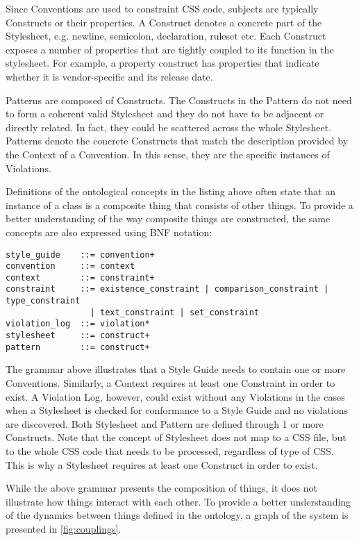Since Conventions are used to constraint CSS code, subjects are typically Constructs or their
properties. A Construct denotes a concrete part of the Stylesheet, e.g. newline, semicolon,
declaration, ruleset etc. Each Construct exposes a number of properties that are tightly coupled to
its function in the stylesheet. For example, a property construct has properties
that indicate whether it is vendor-specific and its release date.

Patterns are composed of Constructs. The Constructs in the Pattern do not need to form a coherent
valid Stylesheet and they do not have to be adjacent or directly related. In fact, they could be
scattered across the whole Stylesheet. Patterns denote the concrete Constructs that match the
description provided by the Context of a Convention. In this sense, they are the specific instances
of Violations.

Definitions of the ontological concepts in the listing above often state that an instance of a
class is a composite thing that consists of other things. To provide a better understanding of the
way composite things are constructed, the same concepts are also expressed using BNF notation:

\begin{snippet}
\begin{verbatim}
style_guide    ::= convention+
convention     ::= context
context        ::= constraint+
constraint     ::= existence_constraint | comparison_constraint | type_constraint  
                 | text_constraint | set_constraint
violation_log  ::= violation*
stylesheet     ::= construct+
pattern        ::= construct+
\end{verbatim}
\end{snippet}

The grammar above illustrates that a Style Guide needs to contain one or more Conventions.
Similarly, a Context requires at least one Constraint in order to exist. A Violation Log, however,
could exist without any Violations in the cases when a Stylesheet is checked for conformance to a
Style Guide and no violations are discovered. Both Stylesheet and Pattern are defined through 1 or
more Constructs. Note that the concept of Stylesheet does not map to a CSS file, but to the whole
CSS code that needs to be processed, regardless of type of CSS. This is why a Stylesheet requires at
least one Construct in order to exist.

While the above grammar presents the composition of things, it does not illustrate how things
interact with each other. To provide a better understanding of the dynamics between things defined
in the ontology, a graph of the system is presented in \autoref{fig:couplings}.

